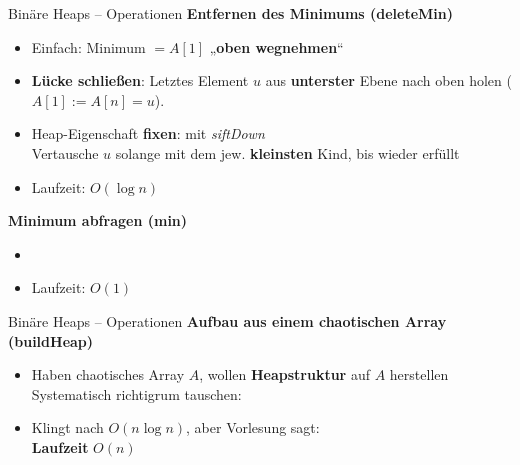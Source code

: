 \begin{frame}{Binäre Heaps – Operationen}
	\textbf{Entfernen des Minimums (deleteMin)}
	\begin{itemize}
		\item Einfach: Minimum $= A[1]$ „\textbf{oben wegnehmen}“
		\pause
		\item \textbf{Lücke schließen}: Letztes Element $u$ aus \textbf{unterster} Ebene nach oben holen ($A[1] := A[n] = u$).
		\pause
		\item Heap-Eigenschaft \textbf{fixen}: mit \emph{siftDown} \\
		Vertausche $u$ solange mit dem jew. \textbf{kleinsten} Kind, bis wieder erfüllt
		\pause
		\item Laufzeit: $O(\log n)$
		\pause
	\end{itemize}
	\forcenewline
	\textbf{Minimum abfragen (min)}
	\begin{itemize}
		\item {}
		\item Laufzeit: $O(1)$
	\end{itemize}
\end{frame}

\begin{frame}{Binäre Heaps – Operationen}
	\textbf{Aufbau aus einem chaotischen Array (buildHeap)} 
	\begin{itemize}
		\item Haben chaotisches Array $A$, wollen \textbf{Heapstruktur} auf $A$ herstellen
		\implitem Systematisch richtigrum tauschen: \\
		\quad {}
		\qquad {}
		\pause
		\item Klingt nach $O(n \log n)$, aber Vorlesung sagt: \\
		\textbf{Laufzeit} $O(n)$
	\end{itemize}
\end{frame}

\iffalse
\begin{frame}{Binäre Heaps}
	\textbf{Adressierbare Heaps} \\[0,125cm]
	\begin{itemize}
		\item Vorhaben: Ermögliche die Änderung des Wertes eines Elementes (d.h. nach der Wertänderung wird das Element an seine neue Position hoch- bzw. runtergetauscht)
		\pause
		\item Problem: Wenn Elemente ihre Position im Array (und somit im Speicher) ständig ändern, können sie nicht beständig adressiert werden
		\pause
		\item Lösung: Halte nicht die Elemente selbst, sondern Referenzen auf diese Elemente in der Datenstruktur
	\end{itemize}
\end{frame}
\fi

